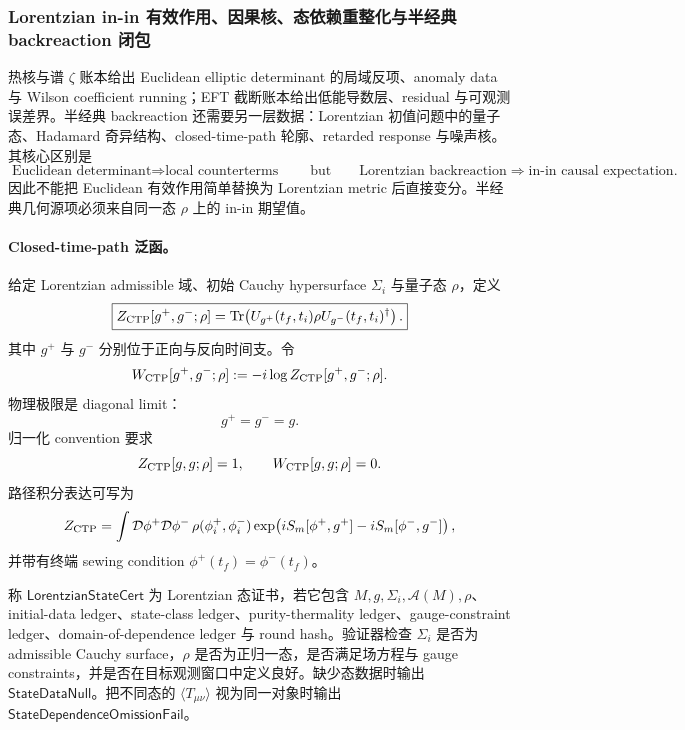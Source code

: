 \subsubsection{Lorentzian in-in 有效作用、因果核、态依赖重整化与半经典 backreaction 闭包}\label{subsubsec:typed-address-biaxial-completion-lorentzian-in-in-causal-backreaction-closure}
热核与谱 \(\zeta\) 账本给出 Euclidean elliptic determinant 的局域反项、anomaly data 与 Wilson coefficient running；EFT 截断账本给出低能导数层、residual 与可观测误差界。半经典 backreaction 还需要另一层数据：Lorentzian 初值问题中的量子态、Hadamard 奇异结构、closed-time-path 轮廓、retarded response 与噪声核。其核心区别是
\[
\boxed{
\text{Euclidean determinant}
\Rightarrow
\text{local counterterms}
}
\qquad\text{but}\qquad
\boxed{
\text{Lorentzian backreaction}
\Rightarrow
\text{in-in causal expectation}.
}
\]
因此不能把 Euclidean 有效作用简单替换为 Lorentzian metric 后直接变分。半经典几何源项必须来自同一态 \(\rho\) 上的 in-in 期望值。

\paragraph{Closed-time-path 泛函。}
给定 Lorentzian admissible 域、初始 Cauchy hypersurface \(\Sigma_i\) 与量子态 \(\rho\)，定义
\[
\boxed{
Z_{\rm CTP}[g^+,g^-;\rho]
=
{\rm Tr}\!\left(
U_{g^+}(t_f,t_i)\rho U_{g^-}(t_f,t_i)^\dagger
\right).
}
\]
其中 \(g^+\) 与 \(g^-\) 分别位于正向与反向时间支。令
\[
W_{\rm CTP}[g^+,g^-;\rho]
:=
-i\log Z_{\rm CTP}[g^+,g^-;\rho].
\]
物理极限是 diagonal limit：
\[
g^+=g^-=g.
\]
归一化 convention 要求
\[
Z_{\rm CTP}[g,g;\rho]=1,
\qquad
W_{\rm CTP}[g,g;\rho]=0.
\]
路径积分表达可写为
\[
Z_{\rm CTP}
=
\int
\mathcal D\phi^+\mathcal D\phi^-\,
\rho(\phi_i^+,\phi_i^-)
\exp\!\left(
iS_m[\phi^+,g^+]-iS_m[\phi^-,g^-]
\right),
\]
并带有终端 sewing condition \(\phi^+(t_f)=\phi^-(t_f)\)。

\begin{definition}\label{def:typed-address-biaxial-completion-lorentzian-state-cert}
称 \(\mathsf{LorentzianStateCert}\) 为 Lorentzian 态证书，若它包含 \(M,g,\Sigma_i,\mathcal A(M),\rho\)、initial-data ledger、state-class ledger、purity-thermality ledger、gauge-constraint ledger、domain-of-dependence ledger 与 round hash。验证器检查 \(\Sigma_i\) 是否为 admissible Cauchy surface，\(\rho\) 是否为正归一态，是否满足场方程与 gauge constraints，并是否在目标观测窗口中定义良好。缺少态数据时输出 \(\mathsf{StateDataNull}\)。把不同态的 \(\langle T_{\mu\nu}\rangle\) 视为同一对象时输出 \(\mathsf{StateDependenceOmissionFail}\)。
\end{definition}

